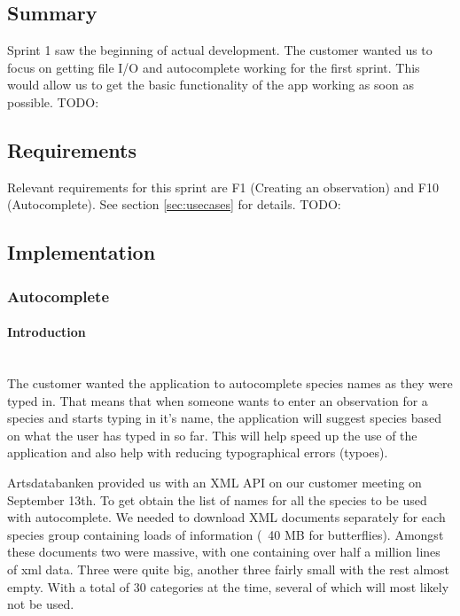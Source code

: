 \subsection{Summary}

	Sprint 1 saw the beginning of actual development. The customer wanted us to focus on getting file I/O and autocomplete working for the first sprint. This would allow us to get the basic functionality of the app working as soon as possible.
	TODO: 

\subsection{Requirements}

	Relevant requirements for this sprint are F1 (Creating an observation) and F10 (Autocomplete). See section \ref{sec:usecases} for details.
	TODO: 

\subsection{Implementation}

	\subsubsection{Autocomplete}

		\paragraph{Introduction} \hspace{1mm}\\
		The customer wanted the application to autocomplete species names as they were typed in. 
		That means that when someone wants to enter an observation for a species and starts typing in it's name, the application will suggest species based on what the user has typed in so far. 
		This will help speed up the use of the application and also help with reducing typographical errors (typoes).

		Artsdatabanken provided us with an XML API on our customer meeting on September 13th. 
		To get obtain the list of names for all the species to be used with autocomplete. 
		We needed to download XML documents separately for each species group containing loads of information (~40 MB for butterflies).
		Amongst these documents two were massive, with one containing over half a million lines of xml data. 
		Three were quite big, another three fairly small with the rest almost empty. With a total of 30 categories at the time, several of which will most likely not be used.

